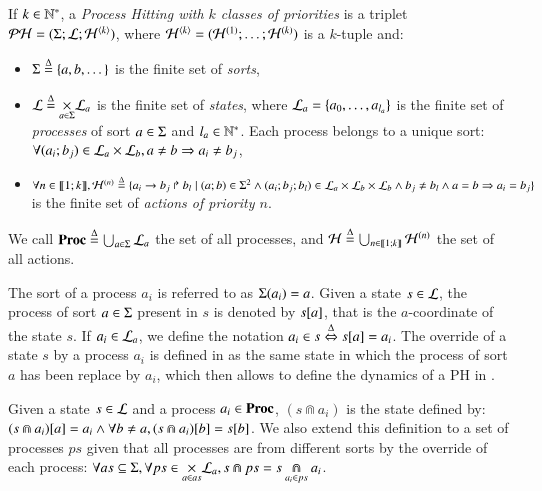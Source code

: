 \begin{definition}
\label{def:ph}
  If $k \in \mathbb{N}^*$, a \emph{Process Hitting with $k$ classes of priorities} is a triplet $\mathcal{PH} = (\Sigma; \mathcal{L}; \mathcal{H}^{\langle k \rangle})$,
  where $\mathcal{H}^{\langle k \rangle} = (\mathcal{H}^{(1)}; \dots; \mathcal{H}^{(k)})$ is a $k$-tuple and:
  \begin{itemize}
    \item $\Sigma \stackrel{\Delta}= \{a, b, \dots\}$ is the finite set of \emph{sorts},
    \item $\mathcal{L} \stackrel{\Delta}= \underset{a \in \Sigma}{\times} \mathcal{L}_a$ is the finite set of \emph{states}, where $\mathcal{L}_a = \{a_0, \ldots, a_{l_a}\}$ is the finite set of \emph{processes} of sort $a \in \Sigma$ and $l_a \in \mathbb{N}^*$. Each process belongs to a unique sort: $\forall (a_i; b_j) \in \mathcal{L}_a \times \mathcal{L}_b, a \neq b \Rightarrow a_i \neq b_j$,
    \item $\forall n \in \llbracket 1; k \rrbracket, \mathcal{H}^{(n)} \stackrel{\Delta}= \{a_i\rightarrow b_j\Rsh b_l \mid (a; b) \in \Sigma^2 \wedge (a_i; b_j; b_l) \in \mathcal{L}_a \times \mathcal{L}_b \times \mathcal{L}_b \wedge b_j \neq b_l \wedge a = b \Rightarrow a_i = b_j \}$ is the finite set of \emph{actions of priority $n$}.
  \end{itemize}
  We call $\mathbf{Proc} \stackrel{\Delta}= \bigcup_{a \in \Sigma} \mathcal{L}_a$ the set of all processes, and $\mathcal{H} \stackrel{\Delta}= \bigcup_{n \in \llbracket 1; k \rrbracket} \mathcal{H}^{(n)}$ the set of all actions.
\end{definition}
\noindent
The sort of a process $a_i$ is referred to as $\Sigma(a_i) = a$.
Given a state $s\in \mathcal{L}$, the process of sort $a \in \Sigma$ present in $s$ is denoted by ${s[a]}$, that is the $a$-coordinate of the state $s$.
If $a_i \in \mathcal{L}_a$, we define the notation $a_i \in s \stackrel{\Delta}\Leftrightarrow {s[a]} = a_i$.
The override of a state $s$ by a process $a_i$ is defined in  as the same state in which the process of sort $a$ has been replace by $a_i$,
which then allows to define the dynamics of a PH in .
\begin{definition}[$\Cap : \PHl \times \PHproc \rightarrow \PHl$]
\label{def:statecap}
  Given a state $s \in \mathcal{L}$ and a process $a_i \in \mathbf{Proc}$, $(s \Cap a_i)$ is the state defined by:
  ${(s \Cap a_i)[a]} = a_i \wedge \forall b \neq a, {(s \Cap a_i)[b]} = {s[b]}$.
  We also extend this definition to a set of processes $ps$ given that all processes are from different sorts by the override of each process:
  $\forall as \subseteq \Sigma, \forall ps \in \underset{a \in as}{\times} \mathcal{L}_a, s \Cap ps = s \underset{a_i \in ps}{\Cap} a_i$.
\end{definition}
